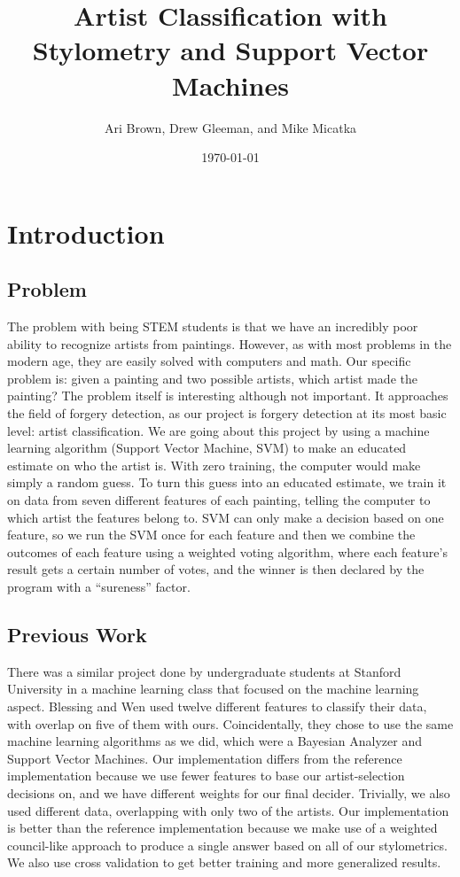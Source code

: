 \documentclass{article}
\title{Artist Classification with Stylometry and Support Vector Machines}
\author{Ari Brown, Drew Gleeman, and Mike Micatka}
\date{\today}
\begin{document}
  \maketitle

  \section{Introduction}
  \subsection{Problem}
  The problem with being STEM students is that we have an incredibly poor ability
  to recognize artists from paintings. However, as with most problems in the
  modern age, they are easily solved with computers and math. Our specific problem
  is: given a painting and two possible artists, which artist made the painting?
  The problem itself is interesting although not important. It approaches the
  field of forgery detection, as our project is forgery detection at its most
  basic level: artist classification. We are going about this project by using a machine learning algorithm (Support
  Vector Machine, SVM) to make an educated estimate on who the artist is. With
  zero training, the computer would make simply a random guess. To turn this guess
  into an educated estimate, we train it on data from seven different features of
  each painting, telling the computer to which artist the features belong to.
  SVM can only make a decision based on one feature, so we run the SVM once for
  each feature and then we combine the outcomes of each feature using a weighted
  voting algorithm, where each feature's result gets a certain number of votes,
  and the winner is then declared by the program with a ``sureness'' factor.

  \subsection{Previous Work}
  There was a similar project done by undergraduate students at Stanford
  University in a machine learning class that focused on the machine learning
  aspect. Blessing and Wen used twelve different features to classify their
  data, with overlap on five of them with ours. Coincidentally, they chose to
  use the same machine learning algorithms as we did, which were a Bayesian
  Analyzer and Support Vector Machines. Our implementation differs from the reference implementation because we use
  fewer features to base our artist-selection decisions on, and we have
  different weights for our final decider. Trivially, we also used different
  data, overlapping with only two of the artists. Our implementation is better than the reference implementation because we
  make use of a weighted council-like approach to produce a single answer
  based on all of our stylometrics. We also use cross validation to get better
  training and more generalized results.
\end{document}
